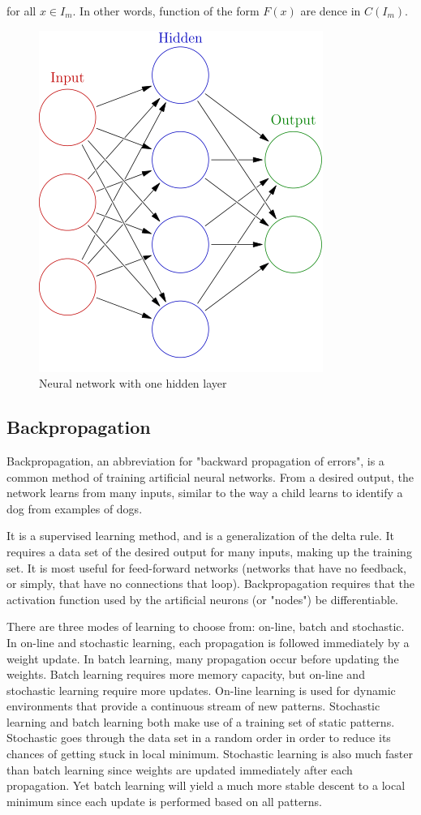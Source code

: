 \documentclass[a4paper,12pt]{article}
\begin{document}
for all $ x \in I_m$. In other words, function of the form $ F(x) $ are dence in $ C(I_m) $.   
\begin{figure}[ht]
 \centering
 \includegraphics[scale=0.4]{images/neurons.png}
 \caption{Neural network with one hidden layer}
\end{figure}

\subsection{Backpropagation}

Backpropagation, an abbreviation for "backward propagation of errors", is a common method of training artificial neural networks. From a desired output, the network learns from many inputs, similar to the way a child learns to identify a dog from examples of dogs.

It is a supervised learning method, and is a generalization of the delta rule. It requires a data set of the desired output for many inputs, making up the training set. It is most useful for feed-forward networks (networks that have no feedback, or simply, that have no connections that loop). Backpropagation requires that the activation function used by the artificial neurons (or "nodes") be differentiable.

There are three modes of learning to choose from: on-line, batch and stochastic. In on-line and stochastic learning, each propagation is followed immediately by a weight update. In batch learning, many propagation occur before updating the weights. Batch learning requires more memory capacity, but on-line and stochastic learning require more updates. On-line learning is used for dynamic environments that provide a continuous stream of new patterns. Stochastic learning and batch learning both make use of a training set of static patterns. Stochastic goes through the data set in a random order in order to reduce its chances of getting stuck in local minimum. Stochastic learning is also much faster than batch learning since weights are updated immediately after each propagation. Yet batch learning will yield a much more stable descent to a local minimum since each update is performed based on all patterns.
\end{document}
